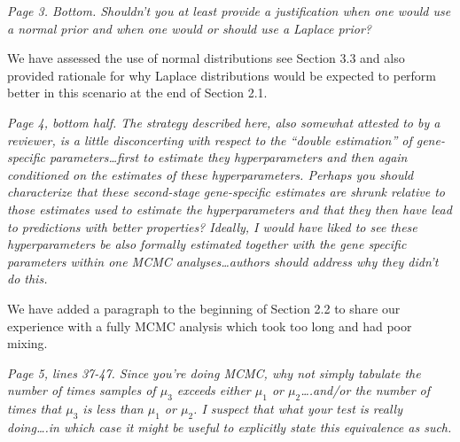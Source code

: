 \documentclass{article}
\newcommand{\comment}[1]{\textit{#1}}
\newcommand{\response}[1]{#1}
\begin{document}
\comment{Page 3. Bottom.  Shouldn’t you at least provide a justification when one would use a normal prior and when one would or should use a Laplace prior?}

\response{We have assessed the use of normal distributions see Section 3.3 and also provided rationale for why Laplace distributions would be expected to perform better in this scenario at the end of Section 2.1.}

\comment{Page 4, bottom half.  The strategy described here, also somewhat attested to by a reviewer, is a little disconcerting with respect to the “double estimation” of gene-specific parameters…first to estimate they hyperparameters and then again conditioned on the estimates of these hyperparameters.  Perhaps you should characterize that these second-stage gene-specific estimates are shrunk relative to those estimates used to estimate the hyperparameters and that they then have lead to predictions with better properties?  Ideally, I would have liked to see these hyperparameters be also formally estimated together with the gene specific parameters within one MCMC analyses…authors should address why they didn’t do this.}

\response{We have added a paragraph to the beginning of Section 2.2 to share our experience with a fully MCMC analysis which took too long and had poor mixing.}

\comment{Page 5, lines 37-47.  Since you’re doing MCMC, why not simply tabulate the number of times samples of $\mu_3$ exceeds either $\mu_1$ or $\mu_2$….and/or the number of times that $\mu_3$ is less than $\mu_1$ or $\mu_2$.  I suspect that what your test is really doing….in which case it might be useful to explicitly state this equivalence as such.}
\end{document}
